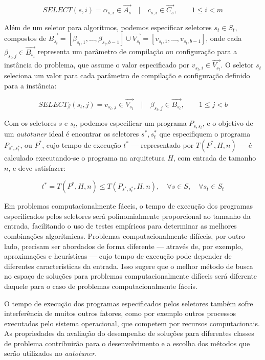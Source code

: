 \documentclass[a4paper, 11pt]{article}
\begin{document}
\begin{equation*}
    SELECT(s, i) = \alpha_{s,i} \in \overrightarrow{A_{s}} \quad | \quad c_{s,i} \in \overrightarrow{C_{s}},
    \quad\quad 1 \leq i < m
\end{equation*}

Além de um seletor para algoritmos, podemos especificar seletores $s_t \in S_t$,
compostos de $\overrightarrow{B_{s_t}} = [\beta_{s_t,1},\dots,\beta_{s_t,b-1}] 
\cup \overrightarrow{V_{s_t}} = [v_{s_t,1},\dots,v_{s_t,b-1}]$,
onde cada $\beta_{s_t,j} \in \overrightarrow{B_{s_t}}$ representa um parâmetro
de compilação ou configuração para a instância do problema, que assume o valor
especificado por $v_{s_t,i} \in \overrightarrow{V_{s_t}}$.
O seletor $s_t$ seleciona um valor para cada parâmetro de compilação e 
configuração definido para a instância:

\begin{equation*}
    SELECT_{\beta}(s_t, j) = v_{s_t,j} \in \overrightarrow{V_{s_t}} \quad | \quad \beta_{s_t,j} \in \overrightarrow{B_{s_t}},
    \quad\quad 1 \leq j < b
\end{equation*}

Com os seletores $s$ e $s_t$, podemos especificar um programa
$P_{s,s_t}$, e o objetivo de um \emph{autotuner} ideal é encontrar
os seletores $s^*,s_{t}^{*}$ que especifiquem o programa $P_{s^*,s_{t}^{*}}$, 
ou $P^*$, cujo tempo de execução $t^*$ --- representado por $T(P^*,H,n)$ --- 
é calculado executando-se o programa na arquitetura $H$, com entrada de tamanho
$n$, e deve satisfazer:

\begin{equation*}
    t^* = T(P^*,H,n) \leq T(P_{s^*,s_{t}^{*}},H,n), \quad \forall s \in S, \quad \forall s_t \in S_t
\end{equation*}

Em problemas computacionalmente fáceis, o tempo de execução dos programas
especificados pelos seletores será polinomialmente proporcional ao tamanho da 
entrada, facilitando o uso de testes empíricos para determinar as melhores
combinações algorítmicas. Problemas computacionalmente difíceis, por outro 
lado, precisam ser abordados de forma diferente --- através de, por exemplo,
aproximações e heurísticas --- cujo tempo de execução pode depender de 
diferentes características da entrada. Isso sugere que o melhor método de busca
no espaço de soluções para problemas computacionalmente difíceis será diferente
daquele para o caso de problemas computacionalmente fáceis.

O tempo de execução dos programas especificados pelos seletores também sofre
interferência de muitos outros fatores, como por exemplo outros processos 
executados pelo sistema operacional, que competem por recursos computacionais.
As propriedades da avaliação do desempenho de soluções para diferentes classes 
de problema contribuirão para o desenvolvimento e a escolha dos métodos
que serão utilizados no \emph{autotuner}.
\end{document}
